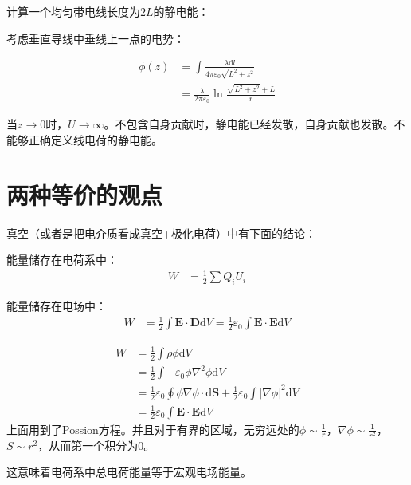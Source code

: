 \documentclass[12pt,onecolumn,a4paper]{book}
\numberwithin{table}{subsection}
\numberwithin{equation}{subsection}
\begin{document}
计算一个均匀带电线长度为$2L$的静电能：

考虑垂直导线中垂线上一点的电势：

\begin{align}
    \phi(z) & = \int \frac{\lambda \mathrm{d} l}{4\pi\varepsilon_0 \sqrt{L^2+z^2}} \\
            & = \frac{\lambda}{2\pi\varepsilon_0} \ln \frac{\sqrt{L^2+z^2} + L}{r}
\end{align}

当$z \rightarrow 0$时，$U  \rightarrow \infty$。不包含自身贡献时，静电能已经发散，自身贡献也发散。不能够正确定义线电荷的静电能。

\section{两种等价的观点}

真空（或者是把电介质看成真空+极化电荷）中有下面的结论：

能量储存在电荷系中：
\begin{align}
    W & = \frac{1}{2} \sum Q_iU_i
\end{align}

能量储存在电场中：
\begin{align}
    W & = \frac{1}{2} \int \mathbf{E} \cdot  \mathbf{D}\mathrm{d} V = \frac{1}{2} \varepsilon_0 \int \mathbf{E} \cdot  \mathbf{E}\mathrm{d} V
\end{align}

\begin{align}
    W & = \frac{1}{2} \int \rho \phi \mathrm{d} V                                                                                                    \\
      & = \frac{1}{2} \int - \varepsilon_0 \phi \nabla^2 \phi \mathrm{d} V                                                                           \\
      & = \frac{1}{2} \varepsilon_0 \oint \phi \nabla \phi \cdot \mathrm{d} \mathbf{S} + \frac{1}{2} \varepsilon_0 \int |\nabla \phi|^2 \mathrm{d} V \\
      & = \frac{1}{2} \varepsilon_0 \int \mathbf{E} \cdot \mathbf{E} \mathrm{d} V
\end{align}
上面用到了Possion方程。并且对于有界的区域，无穷远处的$\phi \sim \frac{1}{r}$，$\nabla \phi \sim \frac{1}{r^2}$，$S \sim r^2$，从而第一个积分为0。

这意味着电荷系中总电荷能量等于宏观电场能量。
\end{document}
